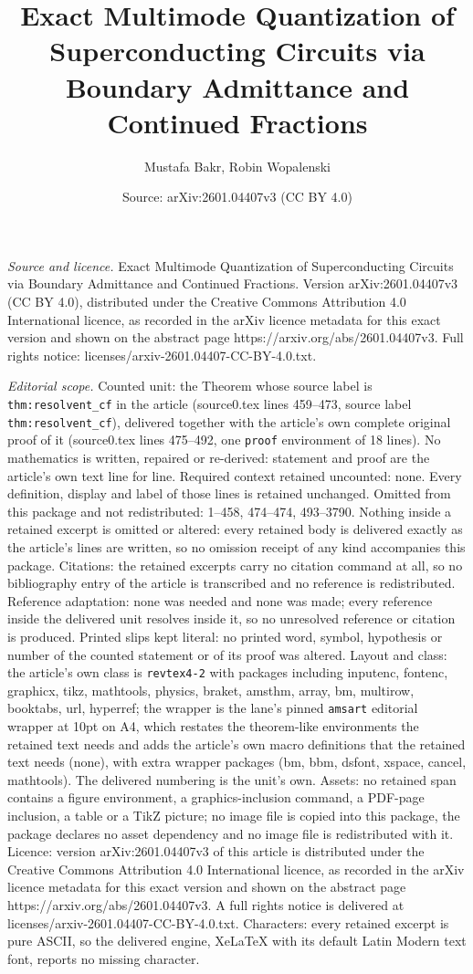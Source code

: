 \documentclass[10pt,a4paper]{amsart}
\title[Exact Multimode Quantization of Superconducting Circuits via]{Exact Multimode Quantization of Superconducting Circuits via Boundary Admittance and Continued Fractions}
\author{Mustafa Bakr, Robin Wopalenski}
\date{Source: arXiv:2601.04407v3 (CC BY 4.0)}
\begin{document}
\maketitle

\noindent\emph{Source and licence.} Exact Multimode Quantization of Superconducting Circuits via Boundary Admittance and Continued Fractions. Version arXiv:2601.04407v3 (CC BY 4.0), distributed under the Creative Commons Attribution 4.0 International licence, as recorded in the arXiv licence metadata for this exact version and shown on the abstract page https://arxiv.org/abs/2601.04407v3. Full rights notice: licenses/arxiv-2601.04407-CC-BY-4.0.txt.\par\smallskip

\noindent\textit{Editorial scope.} Counted unit: the Theorem whose source label is \texttt{thm:resolvent\_cf} in the article (source0.tex lines 459--473, source label \texttt{thm:resolvent\_cf}), delivered together with the article's own complete original proof of it (source0.tex lines 475--492, one \texttt{proof} environment of 18 lines). No mathematics is written, repaired or re-derived: statement and proof are the article's own text line for line. Required context retained uncounted: none. Every definition, display and label of those lines is retained unchanged. Omitted from this package and not redistributed: 1--458, 474--474, 493--3790. Nothing inside a retained excerpt is omitted or altered: every retained body is delivered exactly as the article's lines are written, so no omission receipt of any kind accompanies this package. Citations: the retained excerpts carry no citation command at all, so no bibliography entry of the article is transcribed and no reference is redistributed. Reference adaptation: none was needed and none was made; every reference inside the delivered unit resolves inside it, so no unresolved reference or citation is produced. Printed slips kept literal: no printed word, symbol, hypothesis or number of the counted statement or of its proof was altered. Layout and class: the article's own class is \texttt{revtex4-2} with packages including inputenc, fontenc, graphicx, tikz, mathtools, physics, braket, amsthm, array, bm, multirow, booktabs, url, hyperref; the wrapper is the lane's pinned \texttt{amsart} editorial wrapper at 10pt on A4, which restates the theorem-like environments the retained text needs and adds the article's own macro definitions that the retained text needs (none), with extra wrapper packages (bm, bbm, dsfont, xspace, cancel, mathtools). The delivered numbering is the unit's own. Assets: no retained span contains a figure environment, a graphics-inclusion command, a PDF-page inclusion, a table or a TikZ picture; no image file is copied into this package, the package declares no asset dependency and no image file is redistributed with it. Licence: version arXiv:2601.04407v3 of this article is distributed under the Creative Commons Attribution 4.0 International licence, as recorded in the arXiv licence metadata for this exact version and shown on the abstract page https://arxiv.org/abs/2601.04407v3. A full rights notice is delivered at licenses/arxiv-2601.04407-CC-BY-4.0.txt. Characters: every retained excerpt is pure ASCII, so the delivered engine, XeLaTeX with its default Latin Modern text font, reports no missing character.
\end{document}
